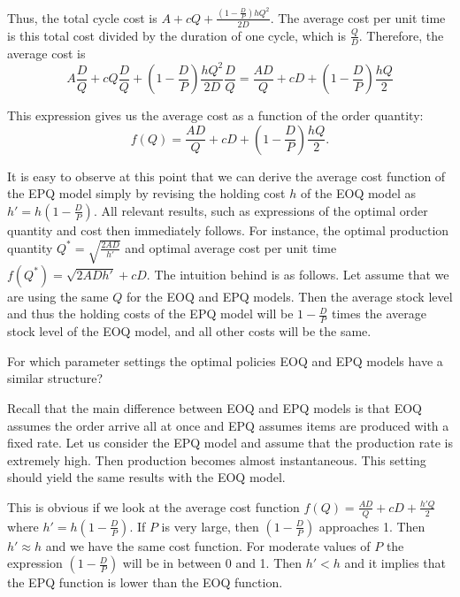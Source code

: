 \begin{solution}
Thus, the total cycle cost is $A+cQ+\frac{(1-\frac{D}{P}) h Q^2}{2D}$. The average cost per unit time is this total cost divided by the duration of one cycle, which is $\frac{Q}{D}$. Therefore, the average cost is
\begin{equation*}
A \frac{D}{Q}+cQ \frac{D}{Q} + \left(1-\frac{D}{P}\right) \frac{h Q^2}{2D} \frac{D}{Q} = \frac{AD}{Q}+cD+\left(1-\frac{D}{P}\right)\frac{hQ}{2}
\end{equation*}

This expression gives us the average cost as a function of the order quantity:
\begin{equation*}
f(Q) = \frac{AD}{Q}+cD+\left(1-\frac{D}{P}\right)\frac{hQ}{2}.
\end{equation*}

It is easy to observe at this point that we can derive the average cost function of the EPQ model simply by revising the holding cost $h$ of the EOQ model as $h'=h \left(1-\frac{D}{P}\right)$. All relevant results, such as expressions of the optimal order quantity and cost then immediately follows. For instance, the optimal production quantity $Q^*=\sqrt{\frac{2AD}{h'}}$ and optimal average cost per unit time $f(Q^*)=\sqrt{2ADh'}+cD$. The intuition behind is as follows. Let assume that we are using the same $Q$ for the EOQ and EPQ models. Then the average stock level and thus the holding costs of the EPQ model will be $1-\frac{D}{P}$ times the average stock level of the EOQ model, and all other costs will be the same.  
\end{solution}

\begin{question}
For which parameter settings the optimal policies EOQ and EPQ models have a similar structure? 
\end{question}

\begin{solution}
Recall that the main difference between EOQ and EPQ models is that EOQ assumes the order arrive all at once and EPQ assumes items are produced with a fixed rate. Let us consider the EPQ model and assume that the production rate is extremely high. Then production becomes almost instantaneous. This setting should yield the same results with the EOQ model.

This is obvious if we look at the average cost function $f(Q) = \frac{AD}{Q}+cD+\frac{h'Q}{2}$ where $h'=h\left(1-\frac{D}{P}\right)$. If $P$ is very large, then 
$\left(1-\frac{D}{P}\right)$ approaches 1. Then $h'\approx h$ and we have the same cost function. For moderate values of $P$ the expression $\left(1-\frac{D}{P}\right)$ will be in between 0 and 1. Then $h'<h$ and it implies that the EPQ function is lower than the EOQ function.
\end{solution}

